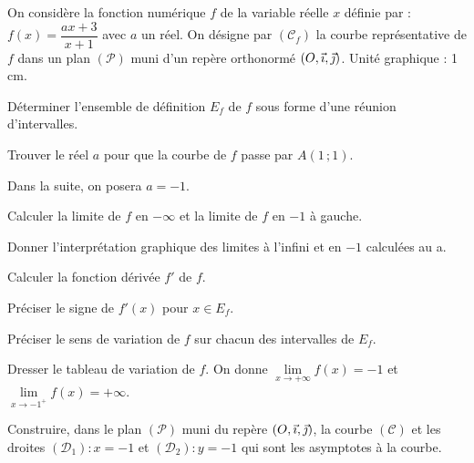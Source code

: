 \documentclass[11pt]{article}
\begin{document}
On considère la fonction numérique $f$ de la variable réelle $x$ définie par : $f(x) = \dfrac{ax + 3}{x + 1}$ avec $a$ un réel. On désigne par $(\mathcal{C}_f)$ la courbe représentative de $f$ dans un plan $(\mathcal{P})$ muni d'un repère orthonormé $(O,\vec{\imath},\vec{\jmath})$. Unité graphique : 1 cm.
\begin{questions}
  \item Déterminer l'ensemble de définition $E_f$ de $f$ sous forme d'une réunion d'intervalles.
  \item Trouver le réel $a$ pour que la courbe de $f$ passe par $A(1\,;1)$.
  \item Dans la suite, on posera $a = -1$.
  \begin{sousq}
    \item Calculer la limite de $f$ en $-\infty$ et la limite de $f$ en $-1$ à gauche.
    \item Donner l'interprétation graphique des limites à l'infini et en $-1$ calculées au a.
  \end{sousq}
  \item \begin{sousq}
    \item Calculer la fonction dérivée $f'$ de $f$.
    \item Préciser le signe de $f'(x)$ pour $x \in E_f$.
    \item Préciser le sens de variation de $f$ sur chacun des intervalles de $E_f$.
    \item Dresser le tableau de variation de $f$. On donne $\lim\limits_{x\to+\infty} f(x) = -1$ et $\lim\limits_{x\to-1^+} f(x) = +\infty$.
  \end{sousq}
  \item Construire, dans le plan $(\mathcal{P})$ muni du repère $(O,\vec{\imath},\vec{\jmath})$, la courbe $(\mathcal{C})$ et les droites $(\mathcal{D}_1) : x = -1$ et $(\mathcal{D}_2) : y = -1$ qui sont les asymptotes à la courbe.
\end{questions}
\end{document}

